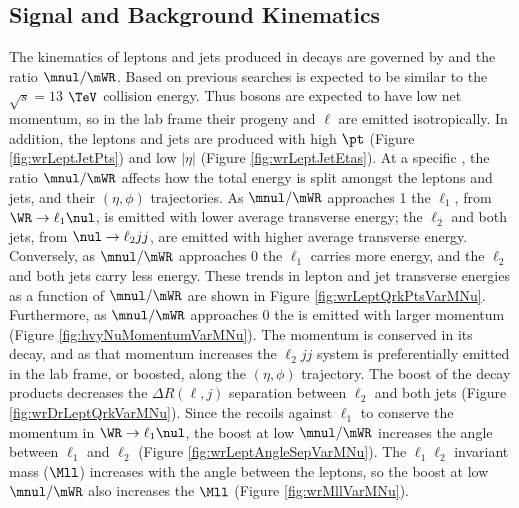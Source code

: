 \subsection{Signal and Background Kinematics}
The kinematics of leptons and jets produced in \WR decays are governed by \mWR and the ratio $\mnul/\mWR$.  Based on previous searches \mWR is 
expected to be similar to 
the $\sqrt{s} = 13$ $\TeV$ collision energy.  Thus \WR bosons are expected to have low net momentum, so in the lab frame their progeny \nul 
and $\ell$ are emitted isotropically.  In addition, the leptons and jets are produced with high $\pt$ (Figure \ref{fig:wrLeptJetPts}) and 
low $|\eta|$ (Figure \ref{fig:wrLeptJetEtas}).  At a specific \mWR, the ratio 
$\mnul/\mWR$ affects how the total energy \mWR is split amongst the leptons and jets, and their $(\eta,\phi)$ trajectories.  As 
$\mnul/\mWR$ approaches 1 the $\ell_{1}$, from $\WR \rightarrow \ell_{1}\nul$, is emitted with lower average transverse energy; the 
$\ell_{2}$ and both jets, from $\nul \rightarrow \ell_{2}jj$, are emitted with higher average transverse energy.  Conversely, as 
$\mnul/\mWR$ approaches 0 the $\ell_{1}$ carries more energy, and the $\ell_{2}$ and both jets carry less energy.  These trends 
in lepton and jet transverse energies as a function of $\mnul/\mWR$ are shown in 
Figure \ref{fig:wrLeptQrkPtsVarMNu}.  Furthermore, as $\mnul/\mWR$ approaches 0 the \nul is emitted with larger momentum (Figure 
\ref{fig:hvyNuMomentumVarMNu}).  The \nul momentum is conserved in its decay, and as that momentum increases the $\ell_{2} jj$ system 
is preferentially emitted in the lab frame, or boosted, along the \nul $(\eta,\phi)$ trajectory.  The boost of the \nul decay products 
decreases the $\Delta R(\ell,j)$ separation between $\ell_{2}$ and both jets (Figure \ref{fig:wrDrLeptQrkVarMNu}).  Since the \nul recoils 
against $\ell_{1}$ to conserve the \WR momentum in $\WR \rightarrow \ell_{1}\nul$, the boost at low $\mnul/\mWR$ increases the angle 
between $\ell_{1}$ and $\ell_{2}$ (Figure \ref{fig:wrLeptAngleSepVarMNu}).  The $\ell_{1}\ell_{2}$ invariant mass ($\Mll$) increases 
with the angle between the leptons, so the boost at low $\mnul/\mWR$ also increases the $\Mll$ (Figure \ref{fig:wrMllVarMNu}).


